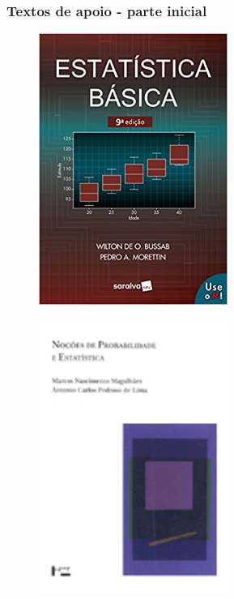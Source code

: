 \documentclass[handout,serif, professionalfont, usenames, dvipsnames, aspectratio = 169]{beamer}\usepackage[]{graphicx}\usepackage[]{color}
\begin{document}
\begin{frame}
  \frametitle{Textos de apoio - parte inicial}
\begin{figure}
\centering
\begin{minipage}{.5\textwidth}
  \centering
  \includegraphics[width=0.55\textwidth]{./pics/BussabMorettin.jpg}
  \label{fig:bussab+morettin}
\end{minipage}%
\begin{minipage}{.5\textwidth}
  \centering
  \includegraphics[width=0.55\textwidth]{./pics/noproest.png}
  \label{fig:magalhaes+lima}
\end{minipage}
\end{figure}
\nocite{bussab+morettin:2017,magalhaes+lima:2015}
\end{frame}
\end{document}
